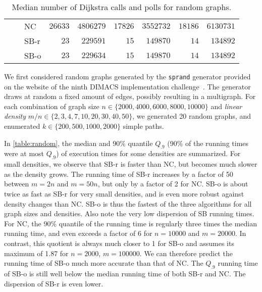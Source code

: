 \documentclass[runningheads,a4paper]{llncs}
\begin{document}
\begin{table}[tb]
\begin{tabularx}{1\textwidth}{p{0.8cm}p{0.8cm}p{0.8cm}|RR|RR|RR}
 & \centering{} & \centering NC & $\num{26633}$ & $\num{4806279}$ & $\num{17826}$ & $\num{3552732}$ & $\num{18186}$ & $\num{6130731}$ \\
 & & \centering SB-r  & $\num{23}$ & $\num{229591}$ & $\num{15}$ & $\num{149870}$ & $\num{14}$ & $\num{134892}$ \\
 & & \centering SB-o  & $\num{23}$ & $\num{229634}$ & $\num{15}$ & $\num{149870}$ & $\num{14}$ & $\num{134892}$ \\
\end{tabularx}
\vspace{2mm}
\caption{Median number of Dijkstra calls and polls for random graphs.}
\label{table:dijkstras}
\end{table}

We first considered random graphs generated by the \texttt{sprand} generator provided on the website of the ninth DIMACS implementation challenge~\cite{CUSTUM:dimacs9}.
The generator draws at random a fixed amount of edges, possibly resulting in a multigraph.
For each combination of graph size $n \in \{\num{2000}, \num{4000}, \num{6000}, \num{8000}, \num{10000}\}$ and \emph{linear density} $m / n \in \{2, 3, 4, 7, 10, 20, 30, 40, 50\}$, we generated 20 random graphs, and enumerated $k \in \{\num{200}, \num{500}, \num{1000}, \num{2000}\}$ simple paths.

In \autoref{table:random}, the median and 90\% quantile $Q_{.9}$ (90\% of the running times were at most $Q_{.9}$) of execution times for some densities are summarized.
For small densities, we observe that SB-r is faster than NC, but becomes much slower as the density grows.
The running time of SB-r increases by a factor of 50 between $m = 2n$ and $m = 50n$, but only by a factor of 2 for NC.
SB-o is about twice as fast as SB-r for very small densities, and is even more robust against density changes than NC.
SB-o is thus the fastest of the three algorithms for all graph sizes and densities.
Also note the very low dispersion of SB running times.
For NC, the 90\% quantile of the running time is regularly three times the median running time, and even exceeds a factor of 6 for $n = \num{10000}$ and $m = \num{20000}$.
In contrast, this quotient is always much closer to 1 for SB-o and assumes its maximum of 1.87 for $n = \num{2000}$, $m = \num{100000}$.
We can therefore predict the running time of SB-o much more accurate than that of NC.
The $Q_{.9}$ running time of SB-o is still well below the median running time of both SB-r and NC.
The dispersion of SB-r is even lower.
\end{document}
